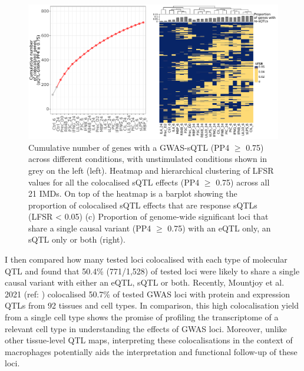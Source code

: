 \begin{figure}[H]
  \centering
  \includegraphics[width=\textwidth]{coloc_cum_response_sqtl}
  \caption[Condition-specificity of colocalised sQTLs]{Cumulative number of genes with a GWAS-sQTL (PP4 $\geq$ 0.75) across different conditions, with unstimulated conditions shown in grey on the left (left). Heatmap and hierarchical clustering of LFSR values for all the colocalised sQTL effects (PP4 $\geq$ 0.75) across all 21 IMDs. On top of the heatmap is a barplot showing the proportion of colocalised sQTL effects that are response sQTLs (LFSR < 0.05) (c) Proportion of genome-wide significant loci that share a single causal variant (PP4 $\geq$ 0.75) with an eQTL only, an sQTL only or both (right).}
  \label{fig:coloc_cum_response_sqtl}   
\end{figure}
I then compared how many tested loci colocalised with each type of molecular QTL and found that 50.4\% (771/1,528) of tested loci were likely to share a single causal variant with either an eQTL, sQTL or both. Recently, Mountjoy et al. 2021 (ref: \cite{Mountjoy2021-fc}) colocalised 50.7\% of tested GWAS loci with protein and expression QTLs from 92 tissues and cell types. In comparison, this high colocalisation yield from a single cell type shows the promise of profiling the transcriptome of a relevant cell type in understanding the effects of GWAS loci. Moreover, unlike other tissue-level QTL maps, interpreting these colocalisations in the context of macrophages potentially aids the interpretation and functional follow-up of these loci. \\

